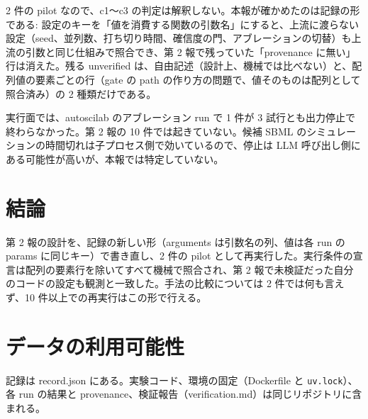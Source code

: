 \documentclass{article}
\providecommand{\airasrecordlink}[1]{#1}
\providecommand{\airasrecordlink}[1]{#1}
\begin{document}
2 件の pilot なので、c1〜c3 の判定は解釈しない。本報が確かめたのは記録の形である: 設定のキーを「値を消費する関数の引数名」にすると、上流に渡らない設定（seed、並列数、打ち切り時間、確信度の門、アブレーションの切替）も上流の引数と同じ仕組みで照合でき、第 2 報で残っていた「provenance に無い」行は消えた。残る unverified は、自由記述（設計上、機械では比べない）と、配列値の要素ごとの行（gate の path の作り方の問題で、値そのものは配列として照合済み）の 2 種類だけである。

実行面では、autoscilab のアブレーション run で 1 件が 3 試行とも出力停止で終わらなかった。第 2 報の 10 件では起きていない。候補 SBML のシミュレーションの時間切れは子プロセス側で効いているので、停止は LLM 呼び出し側にある可能性が高いが、本報では特定していない。

\section{結論}
\label{sec:conclusion}

第 2 報の設計を、記録の新しい形（arguments は引数名の列、値は各 run の params に同じキー）で書き直し、2 件の pilot として再実行した。実行条件の宣言は配列の要素行を除いてすべて機械で照合され、第 2 報で未検証だった自分のコードの設定も観測と一致した。手法の比較については 2 件では何も言えず、10 件以上での再実行はこの形で行える。

\section*{データの利用可能性}
記録は \airasrecordlink{record.json} にある。実験コード、環境の固定（Dockerfile と \texttt{uv.lock}）、各 run の結果と provenance、検証報告（verification.md）は同じリポジトリに含まれる。



\end{document}
